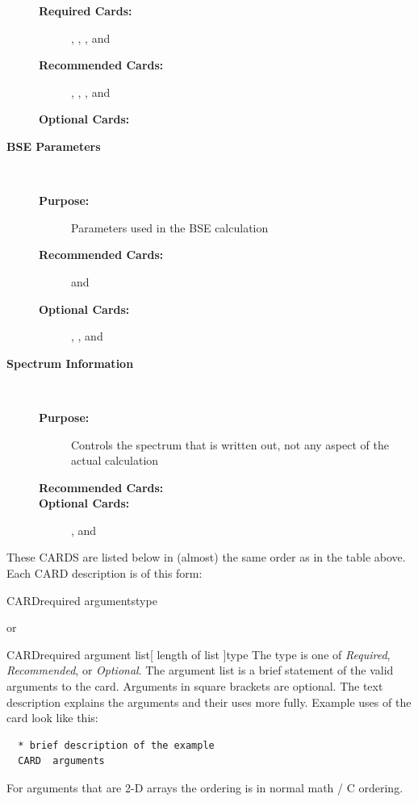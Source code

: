 \documentclass[11pt]{report}
\begin{document}
\begin{description}
\begin{description}
  \item[\textbf{Required Cards:}] 
    ,
    ,
    ,
    and 
  \item[\textbf{Recommended Cards:}] 
     ,
     , 
     , and 
  \item[\textbf{Optional Cards:}]     
  \end{description}
\item[\large\textbf{BSE Parameters}]\dotfill\
  \begin{description}
  \item[\textbf{Purpose:}] Parameters used in the BSE calculation
  \item[\textbf{Recommended Cards:}]   
     and 
  \item[\textbf{Optional Cards:}]   
    ,
    ,
    and  
  \end{description}
\item[\large\textbf{Spectrum Information}]\dotfill\
  \begin{description}
  \item[\textbf{Purpose:}] Controls the spectrum that is written out, not any aspect of the actual calculation
  \item[\textbf{Recommended Cards:}]   
    \htmlref{CNBSE.BROADEN}{card:broaden}  
   \item[\textbf{Optional Cards:}]   
    ,
    and 
  \end{description}   
\end{description}

These CARDS are listed below in (almost) the same order as in the table above.
Each CARD description is of this form:

\begin{Card}{CARD}{required arguments}{type}{}
\end{Card}
or \\
\begin{Card}{CARD}{required argument list[ length of list ]}{type}{}
  The type is one of \textsl{Required}, \textsl{Recommended}, or
  \textsl{Optional}. The argument list is a brief statement of the
  valid arguments to the card. Arguments in square brackets are 
  optional. The text description explains the arguments and 
  their uses more fully. Example uses of the card look like this:
\begin{verbatim}
  * brief description of the example
  CARD  arguments
\end{verbatim}

For arguments that are 2-D arrays the ordering is in normal math / C ordering.
\end{Card}
\end{document}
